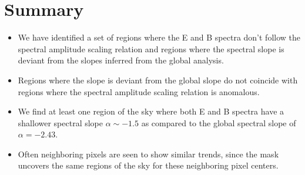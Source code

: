 \documentclass[12pt]{article}
\begin{document}
\begin{figure}[!h]
 \hspace{-0.2cm}
 \hspace{-0.2cm}
 \hspace{-0.2cm}
 \hspace{-0.2cm}
 \hspace{-0.2cm}
\caption{}
\end{figure}

\section{Summary}
\begin{itemize}
\item We have identified a set of regions where the E and B spectra don't follow the spectral amplitude scaling relation and regions where the spectral slope is deviant from the slopes inferred from the global analysis.
\item Regions where the slope is deviant from the global slope do not coincide with regions where the spectral amplitude scaling relation is anomalous.
\item We find at least one region of the sky where both E and B spectra have a shallower spectral slope $\alpha \sim -1.5$ as compared to the global spectral slope of $\alpha=-2.43$.
\item Often neighboring pixels are seen to show similar trends, since the mask uncovers the same regions of the sky for these neighboring pixel centers.
\end{itemize}
\end{document}
